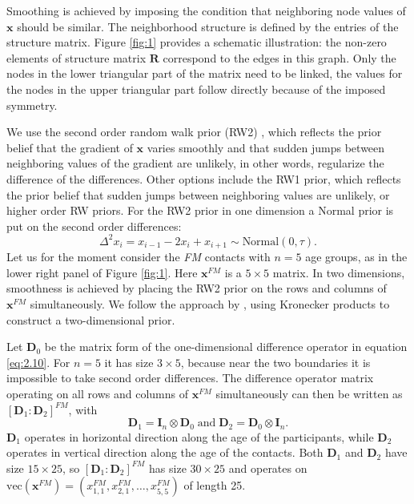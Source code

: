 \documentclass[aoas,preprint]{imsart}
\numberwithin{equation}{section}
\begin{document}
Smoothing is achieved by imposing the condition that neighboring node values of $\bm{x}$ should be similar. The neighborhood structure is defined by the entries of the structure matrix. Figure \ref{fig:1} provides a schematic illustration: the non-zero elements of structure matrix $\bm{R}$ correspond to the edges in this graph. Only the nodes in the lower triangular part of the matrix need to be linked, the values for the nodes in the upper triangular part follow directly because of the imposed symmetry.

We use the second order random walk prior (RW2) \citep{rue_gaussian_2005}, which reflects the prior belief that the gradient of $\bm{x}$ varies smoothly and that sudden jumps between neighboring values of the gradient are unlikely, in other words, regularize the difference of the differences. Other options include the RW1 prior, which reflects the prior belief that sudden jumps between neighboring values are unlikely, or higher order RW priors. For the RW2 prior in one dimension a Normal prior is put on the second order differences:
\begin{equation}\label{eq:2.10}
\Delta^2 x_i = x_{i-1}-2x_i+x_{i+1} \sim \text{Normal}(0, \tau).
\end{equation}
Let us for the moment consider the \textit{FM} contacts with $n = 5$ age groups, as in the lower right panel of Figure \ref{fig:1}. Here $\bm{x}^\textit{FM}$ is a $5 \times 5$ matrix. In two dimensions, smoothness is achieved by placing the RW2 prior on the rows and columns of $\bm{x}^\textit{FM}$ simultaneously. We follow the approach by \cite{currie_smoothing_2004}, using Kronecker products to construct a two-dimensional prior.

Let $\bm{D}_0$ be the matrix form of the one-dimensional difference operator in equation \ref{eq:2.10}. For $n = 5$ it has size $3 \times 5$, because near the two boundaries it is impossible to take second order differences. The difference operator matrix operating on all rows and columns of $\bm{x}^\textit{FM}$ simultaneously can then be written as $[\bm{D}_1 : \bm{D}_2]^\textit{FM}$, with
\begin{equation}\label{eq:2.11}
\bm{D}_1 = \bm{I}_n \otimes \bm{D}_0 \; \text{and} \; \bm{D}_2 = \bm{D}_0 \otimes \bm{I}_n.
\end{equation}
$\bm{D}_1$ operates in horizontal direction along the age of the participants, while $\bm{D}_2$ operates in vertical direction along the age of the contacts. Both $\bm{D}_1$ and $\bm{D}_2$ have size $15 \times 25$, so $[\bm{D}_1 : \bm{D}_2]^\textit{FM}$ has size $30 \times 25$ and operates on $\text{vec}(\bm{x}^\textit{FM}) = (x_{1,1}^\textit{FM}, x_{2,1}^\textit{FM}, \dots, x_{5,5}^\textit{FM})$ of length 25.
\end{document}
